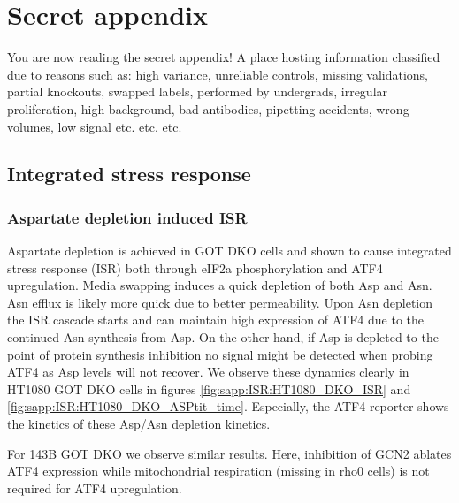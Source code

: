 \chapter{Secret appendix}
You are now reading the secret appendix!
A place hosting information classified due to reasons such as: high variance, unreliable controls, missing validations, partial knockouts, swapped labels, performed by undergrads, irregular proliferation, high background, bad antibodies, pipetting accidents, wrong volumes, low signal etc. etc. etc.



\section{Integrated stress response}

\subsection{Aspartate depletion induced ISR}
Aspartate depletion is achieved in GOT DKO cells and shown to cause integrated stress response (ISR) both through eIF2a phosphorylation and ATF4 upregulation.
Media swapping induces a quick depletion of both Asp and Asn.
Asn efflux is likely more quick due to better permeability.
Upon Asn depletion the ISR cascade starts and can maintain high expression of ATF4 due to the continued Asn synthesis from Asp.
On the other hand, if Asp is depleted to the point of protein synthesis inhibition no signal might be detected when probing ATF4 as Asp levels will not recover.
We observe these dynamics clearly in HT1080 GOT DKO cells in figures \ref{fig:sapp:ISR:HT1080_DKO_ISR} and \ref{fig:sapp:ISR:HT1080_DKO_ASPtit_time}.
Especially, the ATF4 reporter shows the kinetics of these Asp/Asn depletion kinetics.

For 143B GOT DKO we observe similar results.
Here, inhibition of GCN2 ablates ATF4 expression while mitochondrial respiration (missing in rho0 cells) is not required for ATF4 upregulation.

